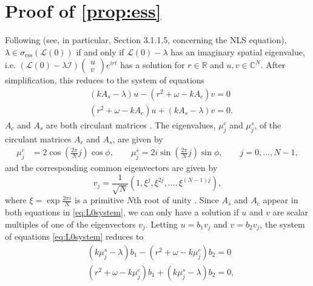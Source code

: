 \documentclass[11pt,reqno]{amsart}
\def\R{{\mathbb R}}
\def\C{{\mathbb C}}
\def\calI{{\mathcal I}}
\def\calL{{\mathcal L}}
\begin{document}
\section{Proof of \texorpdfstring{\cref{prop:ess}}{Proposition 1}}\label{app:prop1proof}

Following \cite[Section 3.1]{Kapitula2013} (see, in particular, Section 3.1.1.5, concerning the NLS equation), $\lambda \in \sigma_{\text{ess}}(\calL(0))$ if and only if $\calL(0) - \lambda$ has an imaginary spatial eigenvalue, i.e. 
$\left(\calL(0)-\lambda \calI \right) \begin{pmatrix}u\\v\end{pmatrix} e^{i r t}$
has a solution for $r \in \R$ and $u, v \in \C^N$. After simplification, this reduces to the system of equations 
\begin{equation}\label{eq:L0system}
\begin{aligned}
&(k A_s - \lambda)u - (r^2 + \omega - k A_c) v = 0 \\
&(r^2 + \omega - k A_c)u + (k A_s - \lambda) v = 0.
\end{aligned}
\end{equation}
$A_c$ and $A_s$ are both circulant matrices \cite{davis2012circulant}. The eigenvalues, $\mu_j^c$ and $\mu_j^s$, of the circulant matrices $A_c$ and $A_s$, are given by
\begin{equation}\label{eq:circeigs}
\begin{aligned}
\mu_j^c &= 2 \cos\left( \frac{2 \pi}{N} j\right) \cos \phi, \qquad 
\mu_j^s = 2 i \sin\left( \frac{2 \pi}{N} j\right) \sin \phi, \qquad
j = 0, \dots, N-1,
\end{aligned}
\end{equation}
and the corresponding common eigenvectors are given by
\begin{equation}\label{eq:circevecs}
v_j = \frac{1}{\sqrt{N}}\left(1, \xi^j, \xi^{2j}, \dots, \xi^{(N-1)j} \right),
\end{equation}
where $\xi = \exp{\frac{2\pi i}{N}}$ is a primitive $N$th root of unity \cite{davis2012circulant}. Since $A_s$ and $A_c$ appear in both equations in \cref{eq:L0system}, we can only have a solution if $u$ and $v$ are scalar multiples of one of the eigenvectors $v_j$. Letting $u = b_1 v_j$ and $v = b_2 v_j$, the system of equations \cref{eq:L0system} reduces to 
\begin{equation}\label{eq:L0system2}
\begin{aligned}
&(k \mu_j^s - \lambda) b_1 - (r^2 + \omega - k \mu_j^c) b_2 = 0 \\
&(r^2 + \omega - k \mu_j^c) b_1 + (k \mu_j^s - \lambda) b_2 = 0,
\end{aligned}
\end{equation}
\end{document}
